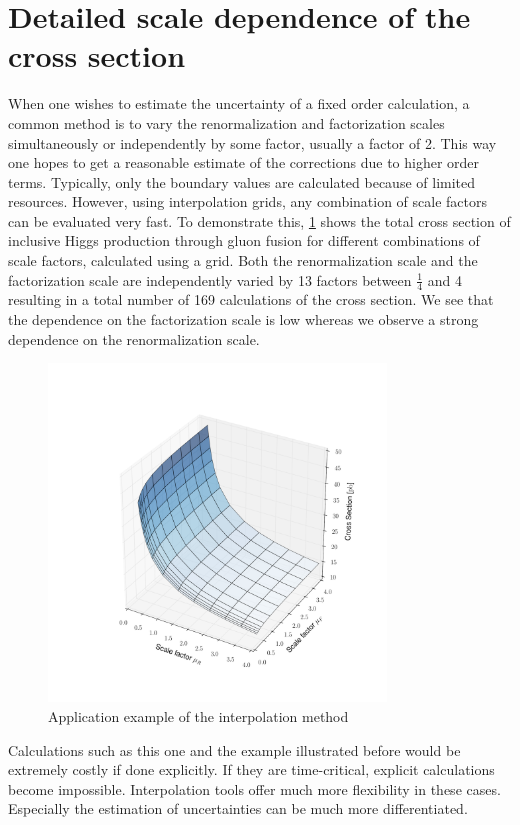 \section{Detailed scale dependence of the cross section}
When one wishes to estimate the uncertainty of a fixed order calculation, a common method is to vary the renormalization and factorization scales simultaneously or independently by some factor, usually a factor of 2.
This way one hopes to get a reasonable estimate of the corrections due to higher order terms.
Typically, only the boundary values are calculated because of limited resources.
However, using interpolation grids, any combination of scale factors can be evaluated very fast.
To demonstrate this, \cref{fig:3dscale} shows the total cross section of inclusive Higgs production through gluon fusion for different combinations of scale factors, calculated using a \fnlo{} grid.
Both the renormalization scale and the factorization scale are independently varied by 13 factors between $\frac{1}{4}$ and \num{4} resulting in a total number of 169 calculations of the cross section.
We see that the dependence on the factorization scale is low whereas we observe a strong dependence on the renormalization scale.
%
\begin{figure}
	\centering
	\includegraphics[width=0.8\textwidth]{images/3dscale.pdf}
	\caption{Application example of the interpolation method}
	\label{fig:3dscale}
\end{figure}
%

Calculations such as this one and the example illustrated before would be extremely costly if done explicitly.
If they are time-critical, explicit calculations become impossible.
Interpolation tools offer much more flexibility in these cases.
Especially the estimation of uncertainties can be much more differentiated.
